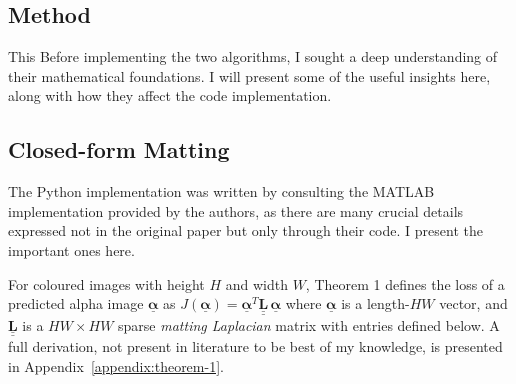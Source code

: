 \documentclass{article}
\theoremstyle{definition}
\def\vt#1{\underline{\mathbf{#1}}}
\def\vts#1{\underline{\boldsymbol{#1}}}
\def\mt#1{\underline{\underline{\mathbf{#1}}}}
\begin{document}
\begin{multicols}{2}[]


\section{Method}


This Before implementing the two algorithms, I sought a deep understanding of their mathematical foundations. I will present some of the useful insights here, along with how they affect the code implementation.

\subsection{Closed-form Matting}\label{s3-closed-form-matting}
The Python implementation was written by consulting the MATLAB implementation provided by the authors, as there are many crucial details expressed not in the original paper but only through their code. I present the important ones here.

For coloured images with height $H$ and width $W$, %
Theorem 1 \cite{closed-form-matting} defines the loss of a predicted alpha image $\vts \alpha$ as $ J(\vts \alpha) = \vts \alpha^T \mt L\, \vts \alpha$ where $\vts \alpha$ is a length-$HW$ vector, and $\mt L$ is a $HW\times HW$ sparse \emph{matting Laplacian} matrix with entries defined below. A full derivation, not present in literature to be best of my knowledge, is presented in Appendix~\ref{appendix:theorem-1}.


\end{multicols}
\end{document}
